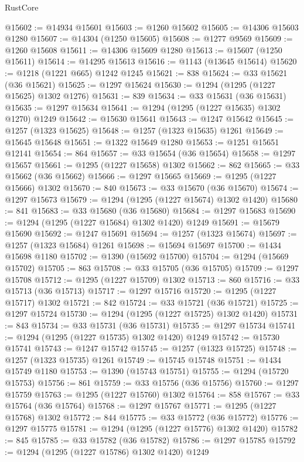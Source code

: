\begin{lexlean}{RustCore}
\begin{coremodule}
@15602 := @14934 @15601
@15603 := @1260 @15602
@15605 := @14306 @15603 @1280
@15607 := @14304 (@1250 @15605)
@15608 := @1277 @9569
@15609 := @1260 @15608
@15611 := @14306 @15609 @1280
@15613 := @15607 (@1250 @15611)
@15614 := @14295 @15613
@15616 := @1143 (@13645 @15614)
@15620 := @1218 (@1221 @665) @1242 @1245
@15621 := 838
@15624 := @33 @15621 (@36 @15621)
@15625 := @1297 @15624
@15630 := @1294 (@1295 (@1227 @15625) @1302 @1276)
@15631 := 839
@15634 := @33 @15631 (@36 @15631)
@15635 := @1297 @15634
@15641 := @1294 (@1295 (@1227 @15635) @1302 @1270) @1249
@15642 := @15630 @15641
@15643 := @1247 @15642
@15645 := @1257 (@1323 @15625)
@15648 := @1257 (@1323 @15635) @1261
@15649 := @15645 @15648
@15651 := @1322 @15649 @1280
@15653 := @1251 @15651 @12141
@15654 := 864
@15657 := @33 @15654 (@36 @15654)
@15658 := @1297 @15657
@15661 := @1295 (@1227 @15658) @1302
@15662 := 862
@15665 := @33 @15662 (@36 @15662)
@15666 := @1297 @15665
@15669 := @1295 (@1227 @15666) @1302
@15670 := 840
@15673 := @33 @15670 (@36 @15670)
@15674 := @1297 @15673
@15679 := @1294 (@1295 (@1227 @15674) @1302 @1420)
@15680 := 841
@15683 := @33 @15680 (@36 @15680)
@15684 := @1297 @15683
@15690 := @1294 (@1295 (@1227 @15684) @1302 @1420) @1249
@15691 := @15679 @15690
@15692 := @1247 @15691
@15694 := @1257 (@1323 @15674)
@15697 := @1257 (@1323 @15684) @1261
@15698 := @15694 @15697
@15700 := @1434 @15698 @1180
@15702 := @1390 (@15692 @15700)
@15704 := @1294 (@15669 @15702)
@15705 := 863
@15708 := @33 @15705 (@36 @15705)
@15709 := @1297 @15708
@15712 := @1295 (@1227 @15709) @1302
@15713 := 860
@15716 := @33 @15713 (@36 @15713)
@15717 := @1297 @15716
@15720 := @1295 (@1227 @15717) @1302
@15721 := 842
@15724 := @33 @15721 (@36 @15721)
@15725 := @1297 @15724
@15730 := @1294 (@1295 (@1227 @15725) @1302 @1420)
@15731 := 843
@15734 := @33 @15731 (@36 @15731)
@15735 := @1297 @15734
@15741 := @1294 (@1295 (@1227 @15735) @1302 @1420) @1249
@15742 := @15730 @15741
@15743 := @1247 @15742
@15745 := @1257 (@1323 @15725)
@15748 := @1257 (@1323 @15735) @1261
@15749 := @15745 @15748
@15751 := @1434 @15749 @1180
@15753 := @1390 (@15743 @15751)
@15755 := @1294 (@15720 @15753)
@15756 := 861
@15759 := @33 @15756 (@36 @15756)
@15760 := @1297 @15759
@15763 := @1295 (@1227 @15760) @1302
@15764 := 858
@15767 := @33 @15764 (@36 @15764)
@15768 := @1297 @15767
@15771 := @1295 (@1227 @15768) @1302
@15772 := 844
@15775 := @33 @15772 (@36 @15772)
@15776 := @1297 @15775
@15781 := @1294 (@1295 (@1227 @15776) @1302 @1420)
@15782 := 845
@15785 := @33 @15782 (@36 @15782)
@15786 := @1297 @15785
@15792 := @1294 (@1295 (@1227 @15786) @1302 @1420) @1249

\end{coremodule}
\end{lexlean}

